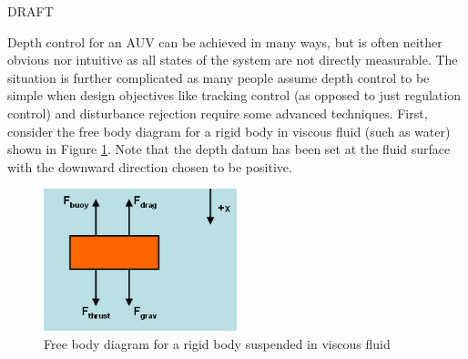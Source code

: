 \documentclass{article}
\begin{document}
\maketitle

\begin{center}
\Huge 
DRAFT
\normalsize
\end{center}
\vspace{0.5cm}

Depth control for an AUV can be achieved in many ways, but is often neither obvious nor intuitive as all states of the system are not directly measurable.  The situation is further complicated as many people assume depth control to be simple when design objectives like tracking control (as opposed to just regulation control) and disturbance rejection require some advanced techniques.  First, consider the free body diagram for a rigid body in viscous fluid (such as water) shown in Figure \ref{fig:freeBody}.  Note that the depth datum has been set at the fluid surface with the downward direction chosen to be positive.

\begin{figure}[h]
\includegraphics[width=0.5\textwidth]{FreeBodyDiagram.png}
\centering
\caption{Free body diagram for a rigid body suspended in viscous fluid}
\label{fig:freeBody}
\end{figure}
\end{document}
